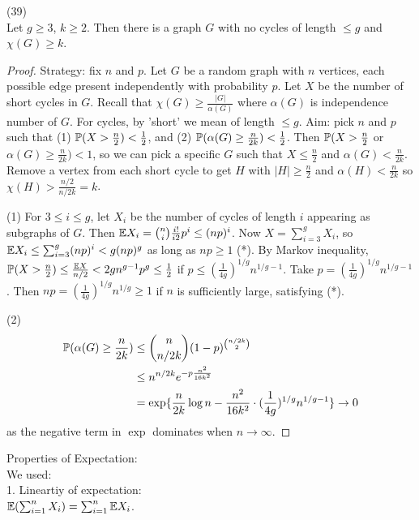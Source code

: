 \documentclass[a4paper]{article}
\begin{document}
\begin{thm} (39)\\
Let $g \geq 3$, $k \geq 2$. Then there is a graph $G$ with no cycles of length $\leq g$ and $\chi(G) \geq k$.
\begin{proof}
Strategy: fix $n$ and $p$. Let $G$ be a random graph with $n$ vertices, each possible edge present independently with probability $p$. Let $X$ be the number of short cycles in $G$. Recall that $\chi(G) \geq \frac{|G|}{\alpha(G)}$ where $\alpha(G)$ is independence number of $G$. For cycles, by 'short' we mean of length $\leq g$. Aim: pick $n$ and $p$ such that (1) $\P(X > \frac{n}{2}) < \frac{1}{2}$, and (2) $\P(\alpha(G) \geq \frac{n}{2k}) < \frac{1}{2}$. Then $\P(X > \frac{n}{2}$ or $\alpha(G) \geq \frac{n}{2k}) < 1$, so we can pick a specific $G$ such that $X \leq \frac{n}{2}$ and $\alpha(G) < \frac{n}{2k}$. Remove a vertex from each short cycle to get $H$ with $|H| \geq \frac{n}{2}$ and $\alpha(H) < \frac{n}{2k}$ so $\chi(H) > \frac{n/2}{n/2k} = k$.

(1) For $3 \leq i \leq g$, let $X_i$ be the number of cycles of length $i$ appearing as subgraphs of $G$. Then $\E X_i = {n \choose i} \frac{i!}{i2}p^i \leq (np)^i$. Now $X = \sum_{i=3}^g X_i$, so $\E X_i \leq \sum_{i=3}^g (np)^i < g(np)^g$ as long as $np \geq 1$ (*). By Markov inequality, $\P(X > \frac{n}{2}) \leq \frac{\E X}{n/2} < 2gn^{g-1} p^g \leq \frac{1}{2}$ if $p \leq (\frac{1}{4g})^{1/g} n^{1/g-1}$. Take $p = (\frac{1}{4g})^{1/g} n^{1/g-1}$. Then $np = (\frac{1}{4g})^{1/g} n^{1/g} \geq 1$ if $n$ is sufficiently large, satisfying (*).

(2)
\begin{equation*}
\begin{aligned}
\P(\alpha(G) \geq \frac{n}{2k}) &\leq {n \choose n/2k} (1-p)^{n/2k \choose 2}\\
&\leq n^{n/2k} e^{-p\frac{n^2}{16k^2}}\\
&= \exp\{\frac{n}{2k} \log n - \frac{n^2}{16k^2} \cdot (\frac{1}{4g})^{1/g} n^{1/g-1}\} \to 0
\end{aligned}
\end{equation*}
as the negative term in $\exp$ dominates when $n \to \infty$.
\end{proof}
\end{thm}

Properties of Expectation:\\
We used:\\
1. Lineartiy of expectation:\\
$\E(\sum_{i=1}^n X_i) = \sum_{i=1}^n \E X_i$.
\end{document}
